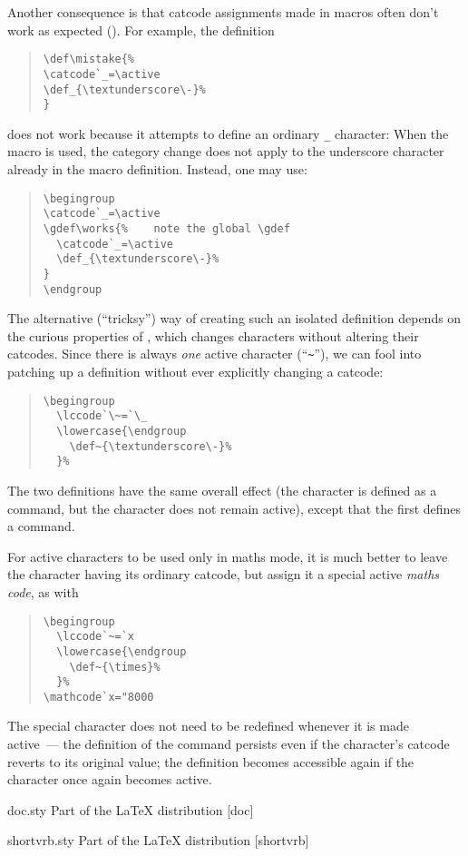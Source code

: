Another consequence is that catcode assignments made
in macros often don't work as expected %
().
For example, the definition
\begin{quote}
\begin{verbatim}
\def\mistake{%
\catcode`_=\active
\def_{\textunderscore\-}%
}
\end{verbatim}
\end{quote}
does not work because it attempts to define an ordinary \texttt{\_} character:
When the macro is used, the category change does not apply to the 
underscore character already in the macro definition.  Instead, one may
use:
\begin{quote}
\begin{verbatim}
\begingroup
\catcode`_=\active
\gdef\works{%    note the global \gdef
  \catcode`_=\active
  \def_{\textunderscore\-}%
}
\endgroup
\end{verbatim}
\end{quote}
The alternative (``tricksy'') way of creating such an isolated
definition depends on the curious properties of , which
changes characters without altering their catcodes.  Since there is
always \emph{one} active character (``\texttt{\textasciitilde}''), we
can fool  into patching up a definition without ever
explicitly changing a catcode:
\begin{quote}
\begin{verbatim}
\begingroup
  \lccode`\~=`\_
  \lowercase{\endgroup
    \def~{\textunderscore\-}%
  }%
\end{verbatim}
\end{quote}
The two definitions have the same overall effect (the character is
defined as a command, but the character does not remain active),
except that the first defines a  command.

For active characters to be used only in maths mode, it is much better
to leave the character having its ordinary catcode, but assign it a
special active \emph{maths code}, as with
\begin{quote}
\begin{verbatim}
\begingroup
  \lccode`~=`x
  \lowercase{\endgroup
    \def~{\times}%
  }%
\mathcode`x="8000
\end{verbatim}
\end{quote}
The special character does not need to be redefined whenever it is
made active~--- the definition of the command persists even if the
character's catcode reverts to its original value; the definition
becomes accessible again if the character once again becomes active.
\begin{ctanrefs}
\item[doc.sty]Part of the \LaTeX{} distribution [doc]
\item[shortvrb.sty]Part of the \LaTeX{} distribution [shortvrb]
\end{ctanrefs}


